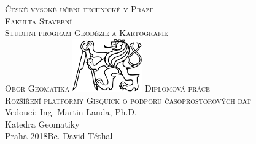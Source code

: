 \begin{center}
\newcommand{\napisCVUT}{České výsoké učení technické v Praze}
\newcommand{\napisFS}{Fakulta Stavební}
\newcommand{\napisProgram}{Studijní program Geodézie a Kartografie}
\newcommand{\napisObor}{Obor Geomatika}
\newcommand{\napisKatedra}{Katedra Geomatiky}
\newcommand{\napisVedouci}{Vedoucí: Ing. Martin Landa, Ph.D.}
\newcommand{\napisAutor}{Bc. David Těthal}
\newcommand{\napisDatum}{Praha 2018}
\newcommand{\napisNazevI}{Rozšíření platformy Gisquick o podporu časoprostorových dat}
\newcommand{\napisDiplomka}{Diplomová práce}
%
\newcommand{\velka}[1]{\textsc{#1}}
%
% 
\newif\ifpatitul
\patitultrue


{\Large\velka{\napisCVUT}}\\
{\Large\velka{\napisFS}}\\
{\Large\velka{\napisProgram}}\\
{\Large\velka{\napisObor}}
\vfill
\includegraphics[width=3cm]{logo_cvut_cb} %
\vfill
{\Large\velka{\napisDiplomka}}\\
\Large\velka{\napisNazevI}\\
\vfill
{\large%
\napisVedouci\\
\napisKatedra\\
\bigskip
\napisDatum\hfill\napisAutor}
\end{center}
